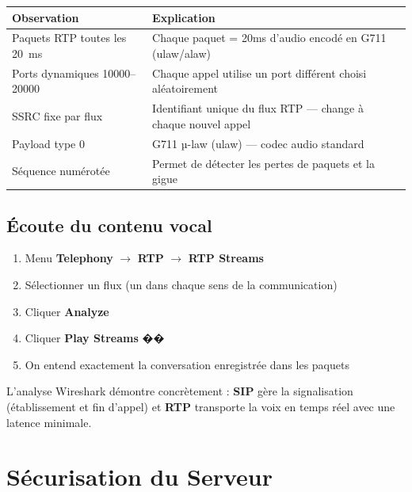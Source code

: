 \documentclass[a4paper,11pt]{report}
\begin{document}
\begin{center}
\begin{tabularx}{\textwidth}{lX}
\toprule
\rowcolor{primarylight}\textbf{Observation} & \textbf{Explication}\\
\midrule
Paquets RTP toutes les 20~ms & Chaque paquet = 20ms d'audio encodé en G711 (ulaw/alaw)\\
Ports dynamiques 10000--20000 & Chaque appel utilise un port différent choisi aléatoirement\\
SSRC fixe par flux & Identifiant unique du flux RTP — change à chaque nouvel appel\\
Payload type 0 & G711 µ-law (ulaw) — codec audio standard\\
Séquence numérotée & Permet de détecter les pertes de paquets et la gigue\\
\bottomrule
\end{tabularx}
\end{center}

\section{Écoute du contenu vocal}

\begin{enumerate}[leftmargin=1.4em, itemsep=4pt]
  \item Menu \textbf{Telephony} $\to$ \textbf{RTP} $\to$ \textbf{RTP Streams}
  \item Sélectionner un flux (un dans chaque sens de la communication)
  \item Cliquer \textbf{Analyze}
  \item Cliquer \textbf{Play Streams} ��
  \item On entend exactement la conversation enregistrée dans les paquets
\end{enumerate}

\begin{successbox}
L'analyse Wireshark démontre concrètement : \textbf{SIP} gère la signalisation (établissement et fin d'appel) et \textbf{RTP} transporte la voix en temps réel avec une latence minimale.
\end{successbox}

\chapter{Sécurisation du Serveur}
\end{document}
